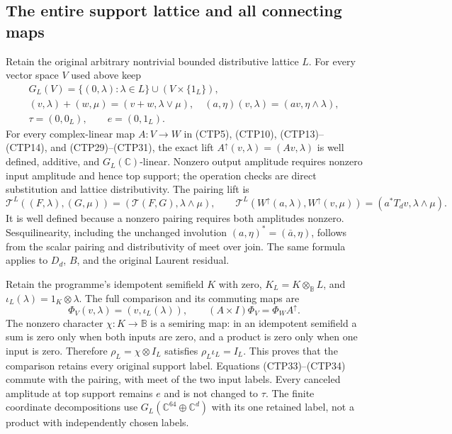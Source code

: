 \subsection{The entire support lattice and all connecting maps}

Retain the original arbitrary nontrivial bounded distributive
lattice $L$. For every vector space $V$ used above keep
\begin{equation}\tag{CTP32}
\begin{gathered}
 G_L(V)=\{(0,\lambda):\lambda\in L\}\cup(V\times\{1_L\}),\\
 (v,\lambda)+(w,\mu)=(v+w,\lambda\vee\mu),\quad
 (a,\eta)(v,\lambda)=(av,\eta\wedge\lambda),\\
 \tau=(0,0_L),\qquad e=(0,1_L).
\end{gathered}
\end{equation}
For every complex-linear map $A:V\to W$ in (CTP5), (CTP10),
(CTP13)--(CTP14), and (CTP29)--(CTP31), the exact lift
$A^\uparrow(v,\lambda)=(Av,\lambda)$ is well defined,
additive, and $G_L(\mathbb C)$-linear. Nonzero output amplitude
requires nonzero input amplitude and hence top support; the
operation checks are direct substitution and lattice
distributivity. The pairing lift is
\begin{equation}\tag{CTP33}
 \mathcal T^L((F,\lambda),(G,\mu))
       =(\mathcal T(F,G),\lambda\wedge\mu),\qquad
 \mathcal T^L(W^\uparrow(a,\lambda),W^\uparrow(v,\mu))
       =(a^*T_dv,\lambda\wedge\mu).
\end{equation}
It is well defined because a nonzero pairing requires both
amplitudes nonzero. Sesquilinearity, including the unchanged
involution $(a,\eta)^*=(\bar a,\eta)$, follows from the scalar
pairing and distributivity of meet over join. The same formula
applies to $D_d$, $B$, and the original Laurent residual.

Retain the programme's idempotent semifield $K$ with zero,
$K_L=K\otimes_{\mathbb B}L$, and $\iota_L(\lambda)=1_K\otimes\lambda$.
The full comparison and its commuting maps are
\begin{equation}\tag{CTP34}
 \Phi_V(v,\lambda)=(v,\iota_L(\lambda)),\qquad
 (A\times I)\Phi_V=\Phi_WA^\uparrow.
\end{equation}
The nonzero character $\chi:K\to\mathbb B$ is a semiring map:
in an idempotent semifield a sum is zero only when both inputs
are zero, and a product is zero only when one input is zero.
Therefore $\rho_L=\chi\otimes I_L$ satisfies
$\rho_L\iota_L=I_L$. This proves that the comparison retains
every original support label. Equations (CTP33)--(CTP34)
commute with the pairing, with meet of the two input labels.
Every canceled amplitude at top support remains $e$ and is
not changed to $\tau$. The finite coordinate decompositions
use $G_L(\mathbb C^{64}\oplus\mathbb C^d)$ with its one retained
label, not a product with independently chosen labels.

